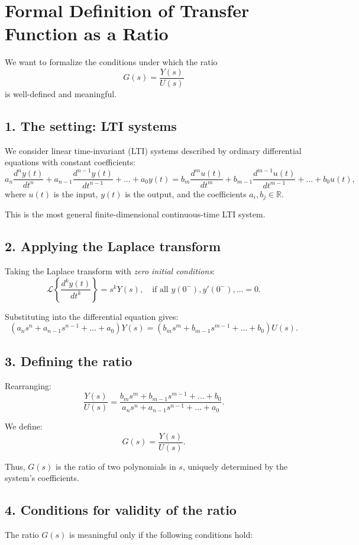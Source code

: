 \documentclass[12pt,a4paper]{article}
\begin{document}
	
	\section*{Formal Definition of Transfer Function as a Ratio}
	
	We want to formalize the conditions under which the ratio
	$$
	G(s) = \frac{Y(s)}{U(s)}
	$$
	is well-defined and meaningful.
	
	\subsection*{1. The setting: LTI systems}
	We consider linear time-invariant (LTI) systems described by ordinary differential equations with constant coefficients:
	$$
	a_n \frac{d^n y(t)}{dt^n} + a_{n-1}\frac{d^{n-1}y(t)}{dt^{n-1}} + \dots + a_0 y(t) 
	= b_m \frac{d^m u(t)}{dt^m} + b_{m-1}\frac{d^{m-1}u(t)}{dt^{m-1}} + \dots + b_0 u(t),
	$$
	where $u(t)$ is the input, $y(t)$ is the output, and the coefficients $a_i, b_j \in \mathbb{R}$.
	
	This is the most general finite-dimensional continuous-time LTI system.
	
	\subsection*{2. Applying the Laplace transform}
	Taking the Laplace transform with \emph{zero initial conditions}:
	$$
	\mathcal{L}\!\left\{ \frac{d^k y(t)}{dt^k} \right\} = s^k Y(s), \quad 
	\text{if all } y(0^-), y'(0^-), \dots = 0.
	$$
	
	Substituting into the differential equation gives:
	$$
	(a_n s^n + a_{n-1} s^{n-1} + \dots + a_0) Y(s) 
	= (b_m s^m + b_{m-1} s^{m-1} + \dots + b_0) U(s).
	$$
	
	\subsection*{3. Defining the ratio}
	Rearranging:
	$$
	\frac{Y(s)}{U(s)} = 
	\frac{b_m s^m + b_{m-1} s^{m-1} + \dots + b_0}
	{a_n s^n + a_{n-1} s^{n-1} + \dots + a_0}.
	$$
	
	We define:
	$$
	G(s) = \frac{Y(s)}{U(s)}.
	$$
	
	Thus, $G(s)$ is the ratio of two polynomials in $s$, uniquely determined by the system’s coefficients.
	
	\subsection*{4. Conditions for validity of the ratio}
	The ratio $G(s)$ is meaningful only if the following conditions hold:
	
\end{document}
